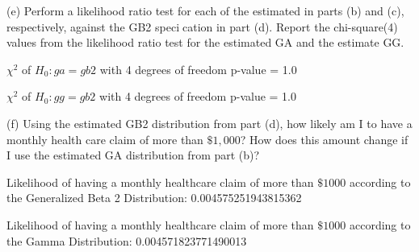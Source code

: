 \documentclass[letterpaper,12pt]{article}
\theoremstyle{definition}
\begin{document}
\noindent(e) Perform a likelihood ratio test for each of the estimated in parts (b) and (c), respectively, against the GB2 specication in part (d). Report the chi-square(4) values from the likelihood ratio test for the estimated GA and the estimate GG.
\par\bigskip
$\chi^2$ of $H_{0}: ga = gb2$ with 4 degrees of freedom p-value =  1.0
\par
$\chi^2$ of $H_{0}: gg = gb2$ with 4 degrees of freedom p-value =  1.0
\par\bigskip

\noindent(f) Using the estimated GB2 distribution from part (d), how likely am I to have a monthly health care claim of more than $\$1,000$? How does this amount change if I use the estimated GA distribution from part (b)?
\par\bigskip
Likelihood of having a monthly healthcare claim of more than $\$1000$ according to the Generalized Beta 2 Distribution:  0.004575251943815362
\par
Likelihood of having a monthly healthcare claim of more than $\$1000$ according to the Gamma Distribution:  0.004571823771490013
\end{document}
